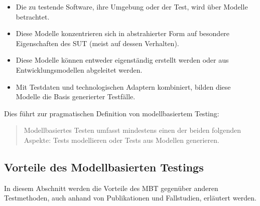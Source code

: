\begin{itemize}
\item Die zu testende Software, ihre Umgebung oder der Test, wird über Modelle betrachtet.
\item Diese Modelle konzentrieren sich in abstrahierter Form auf besondere Eigenschaften des SUT  (meist auf dessen Verhalten).
\item Diese Modelle können entweder eigenständig erstellt werden oder aus Entwicklungsmodellen abgeleitet werden.
\item Mit Testdaten und technologischen Adaptern kombiniert, bilden diese Modelle die Basis generierter Testfälle.
\end{itemize}

Dies führt zur pragmatischen Definition von modellbasiertem Testing:

\begin{quote}
Modellbasiertes Testen umfasst mindestens einen der beiden folgenden Aspekte: Tests modellieren oder Tests aus Modellen generieren.
\end{quote}

\subsection{Vorteile des Modellbasierten Testings}

\label{sec:mbt_vorteile}
In diesem Abschnitt werden die Vorteile des MBT   gegenüber anderen Testmethoden, auch anhand von Publikationen und Fallstudien, erläutert werden.



